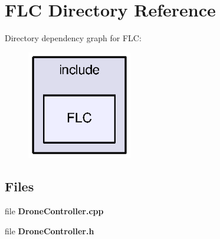 \section{F\-L\-C Directory Reference}
\label{dir_81d778bb7e63fafc7debbf49faaed437}
Directory dependency graph for F\-L\-C\-:\nopagebreak
\begin{figure}[H]
\begin{center}
\leavevmode
\includegraphics[width=130pt]{dir_81d778bb7e63fafc7debbf49faaed437_dep}
\end{center}
\end{figure}
\subsection*{Files}
\begin{DoxyCompactItemize}
\item 
file {\bf Drone\-Controller.\-cpp}
\item 
file {\bf Drone\-Controller.\-h}
\end{DoxyCompactItemize}
